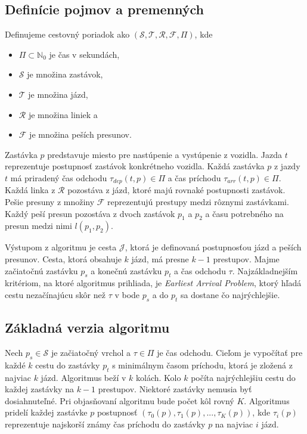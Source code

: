 \subsection{Definície pojmov a premenných}
\label{sec:raptor-definitions}

Definujeme cestovný poriadok ako $(\mathcal{S,T,R,F},\Pi)$, kde 
\begin{itemize}
\setlength\itemsep{-0.3em}
\item $\Pi \subset \mathbb{N}_{0}$ je čas v sekundách, 
\item $\mathcal{S}$ je množina zastávok,
\item $\mathcal{T}$ je množina jázd, 
\item $\mathcal{R}$ je množina liniek a 
\item $\mathcal{F}$ je množina peších presunov.
\end{itemize}

Zastávka $p$ predstavuje miesto pre nastúpenie a vystúpenie z vozidla. Jazda $t$ reprezentuje postupnosť zastávok konkrétneho vozidla. Každá zastávka $p$ z jazdy $t$ má priradený čas odchodu $\tau_{dep}(t, p) \in \Pi$ a čas príchodu $\tau_{arr}(t, p) \in \Pi$. Každá linka z $\mathcal{R}$ pozostáva z jázd, ktoré majú rovnaké postupnosti zastávok. Pešie presuny z množiny $\mathcal{F}$ reprezentujú prestupy medzi rôznymi zastávkami. Každý peší presun pozostáva z dvoch zastávok $p_1$ a $p_2$ a času potrebného na presun medzi nimi $l(p_1, p_2)$. 

Výstupom z algoritmu je cesta $\mathcal{J}$, ktorá je definovaná postupnosťou jázd a peších presunov. Cesta, ktorá obsahuje $k$ jázd, má presne $k-1$ prestupov. Majme začiatočnú zastávku $p_s$ a konečnú zastávku $p_t$ a čas odchodu $\tau$. Najzákladnejším kritériom, na ktoré algoritmus prihliada, je \textit{Earliest Arrival Problem}, ktorý hľadá cestu nezačínajúcu skôr než $\tau$ v bode $p_s$ a do $p_t$ sa dostane čo najrýchlejšie.

\subsection{Základná verzia algoritmu}
\label{sub:raptor-basic}

Nech $p_s \in \mathcal{S}$ je začiatočný vrchol a $\tau \in \Pi$ je čas odchodu. Cieľom je vypočítať pre každé $k$ cestu do zastávky $p_t$ s minimálnym časom príchodu, ktorá je zložená z najviac $k$ jázd. Algoritmus beží v $k$ kolách. Kolo $k$ počíta najrýchlejšiu cestu do každej zastávky na $k-1$ prestupov. Niektoré zastávky nemusia byť dosiahnuteľné. Pri objasňovaní algoritmu bude počet kôl rovný $K$. Algoritmus pridelí každej zastávke $p$ postupnosť $(\tau_0(p), \tau_1(p), ..., \tau_K(p))$, kde $\tau_i(p)$ reprezentuje najskorší známy čas príchodu do zastávky $p$ na najviac $i$ jázd. 

